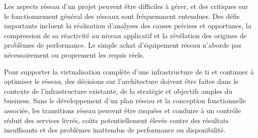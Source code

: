 Les aspects réseau d'un projet peuvent être difficiles à gérer, et des critiques sur le fonctionnement général des réseaux sont fréquemment entendues. Des défis importants incluent la réalisation d'analyses des causes précises et opportunes, la compression de sa réactivité au niveau applicatif et la révélation des origines de problèmes de performance. Le simple achat d'équipement réseau n'aborde pas nécessairement ou proprement les requis réels.





Pour supporter la virtualisation complète d'une infrastructure de \gls{ti} et continuer à optimiser le réseau, des décisions sur l'architecture doivent être faites dans le contexte de l'infrastructure existante, de la stratégie et objectifs amples du business. Sans le développement d'un plan réseau et la conception fonctionnelle associée, les transitions réseau peuvent être risquées et conduire à un contrôle réduit des services livrés, coûts potentiellement élevés contre des résultats insuffisants et des problèmes inattendus de performance ou disponibilité. 


